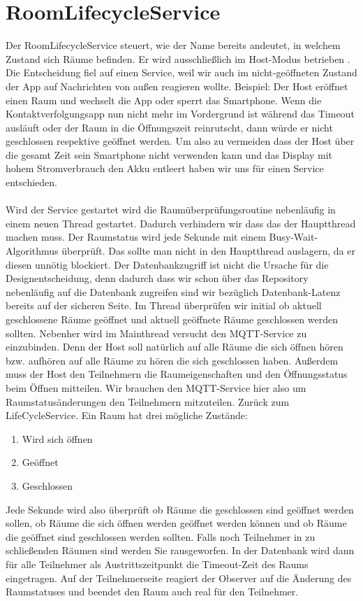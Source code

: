 \section{RoomLifecycleService}
\label{sec:RoomLifecycleService}
Der RoomLifecycleService steuert, wie der Name bereits andeutet, in welchem Zustand sich Räume befinden. Er wird ausschließlich im Host-Modus betrieben .
Die Entscheidung fiel auf einen Service, weil wir auch im nicht-geöffneten Zustand der App auf Nachrichten von außen reagieren wollte. 
Beispiel: Der Host eröffnet einen Raum und wechselt die App oder sperrt das Smartphone. Wenn die Kontaktverfolgungsapp nun nicht mehr im Vordergrund ist während das Timeout ausläuft oder der Raum in die Öffnungszeit reinrutscht, dann würde er nicht geschlossen respektive geöffnet werden. Um also zu vermeiden dass der Host über die gesamt Zeit sein Smartphone nicht verwenden kann und das Display mit hohem Stromverbrauch den Akku entleert haben wir uns für einen Service entschieden. 
\\\\
Wird der Service gestartet wird die Raumüberprüfungsroutine nebenläufig in einem neuen Thread gestartet. Dadurch verhindern wir dass das der Hauptthread machen muss. Der Raumstatus wird jede Sekunde mit einem Busy-Wait-Algorithmus überprüft. Das sollte man nicht in den Hauptthread auslagern, da er diesen unnötig blockiert. Der Datenbankzugriff ist nicht die Ursache für die Designentscheidung, denn dadurch dass wir schon über das Repository nebenläufig auf die Datenbank zugreifen sind wir bezüglich Datenbank-Latenz bereits auf der sicheren Seite.
Im Thread überprüfen wir initial ob aktuell geschlossene Räume geöffnet und aktuell geöffnete Räume geschlossen werden sollten.
 Nebenher wird im Mainthread versucht den MQTT-Service zu einzubinden. Denn der Host soll natürlich auf alle Räume die sich öffnen hören bzw. aufhören auf alle Räume zu hören die sich geschlossen haben. 
Außerdem muss der Host den Teilnehmern die Raumeigenschaften und den Öffnungsstatus beim Öffnen mitteilen. Wir brauchen den MQTT-Service hier also um Raumstatusänderungen den Teilnehmern mitzuteilen.
Zurück zum LifeCycleService.
Ein Raum hat drei mögliche Zustände:
\begin{enumerate}
\item Wird sich öffnen
\item Geöffnet
\item Geschlossen
\end{enumerate}
 Jede Sekunde wird also überprüft ob Räume die geschlossen sind geöffnet werden sollen, ob Räume die sich öffnen werden geöffnet werden können und ob Räume die geöffnet sind geschlossen werden sollten. 
Falls noch Teilnehmer in zu schließenden Räumen sind werden Sie rausgeworfen. In der Datenbank wird dann für alle Teilnehmer als Austrittszeitpunkt die Timeout-Zeit des Raums eingetragen. 
Auf der Teilnehmerseite reagiert der Observer auf die Änderung des Raumstatuses und beendet den Raum auch real für den Teilnehmer.

